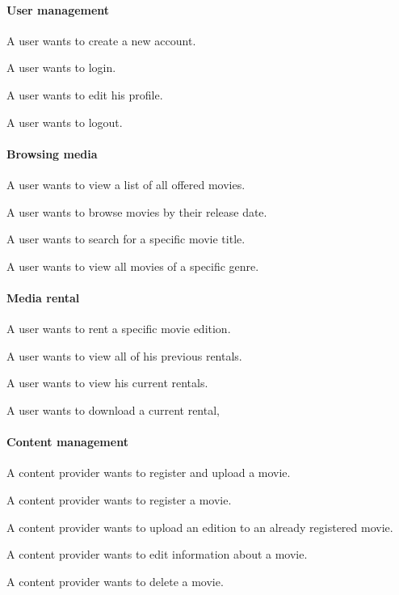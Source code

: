 \paragraph{User management}
\begin{my_itemize}
	\item A user wants to create a new account.
	\item A user wants to login.
	\item A user wants to edit his profile.
	\item A user wants to logout.
\end{my_itemize}

\paragraph{Browsing media}
\begin{my_itemize}
	\item A user wants to view a list of all offered movies.
	\item A user wants to browse movies by their release date.
	\item A user wants to search for a specific movie title.
	\item A user wants to view all movies of a specific genre.
\end{my_itemize}

\paragraph{Media rental}
\begin{my_itemize}
	\item A user wants to rent a specific movie edition.
	\item A user wants to view all of his previous rentals.
	\item A user wants to view his current rentals.
	\item A user wants to download a current rental,
\end{my_itemize}

\paragraph{Content management}
\begin{my_itemize}
	\item A content provider wants to register and upload a movie.
	\item A content provider wants to register a movie.
	\item A content provider wants to upload an edition to an already registered movie.
	\item A content provider wants to edit information about a movie.
	\item A content provider wants to delete a movie.
\end{my_itemize}